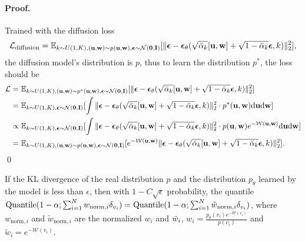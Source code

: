 \paragraph{Proof.} Trained with the diffusion loss
\begin{align}
\mathcal{L_\textrm{diffusion}}=\mathbb{E}_{k\sim U(1,K),(\mathbf{u},\mathbf{w})\sim p(\mathbf{u},\mathbf{w}),\bm{\epsilon}\sim \mathcal{N}(\mathbf{0},\mathbf{I})}
[\|\mathbf{\bm{\epsilon}} - \bm{\epsilon}_\theta(\sqrt{\bar{\alpha}_k}[\mathbf{u},\mathbf{w}] + \sqrt{1-\bar{\alpha}_k} \bm{\epsilon},k)\|_2^2],
\end{align}
the diffusion model's distribution is $p$, thus to learn the distribution $p^*$, the loss should be 
\begin{align}
\mathcal{L}&=\mathbb{E}_{k\sim U(1,K),(\mathbf{u},\mathbf{w})\sim p^*(\mathbf{u},\mathbf{w}),\bm{\epsilon}\sim \mathcal{N}(\mathbf{0},\mathbf{I})}
[\|\mathbf{\bm{\epsilon}} - \bm{\epsilon}_\theta(\sqrt{\bar{\alpha}_k}[\mathbf{u},\mathbf{w}] + \sqrt{1-\bar{\alpha}_k} \bm{\epsilon},k)\|_2^2] \\
&=\mathbb{E}_{k\sim U(1,K),\bm{\epsilon}\sim \mathcal{N}(\mathbf{0},\mathbf{I})}
[\int\|\mathbf{\bm{\epsilon}} - \bm{\epsilon}_\theta(\sqrt{\bar{\alpha}_k}[\mathbf{u},\mathbf{w}] + \sqrt{1-\bar{\alpha}_k} \bm{\epsilon},k)\|_2^2 \cdot p^*(\mathbf{u},\mathbf{w}) \textrm{d}\mathbf{u}\textrm{d}\mathbf{w}] \\
&\propto\mathbb{E}_{k\sim U(1,K),\bm{\epsilon}\sim \mathcal{N}(\mathbf{0},\mathbf{I})}
[\int\|\mathbf{\bm{\epsilon}} - \bm{\epsilon}_\theta(\sqrt{\bar{\alpha}_k}[\mathbf{u},\mathbf{w}] + \sqrt{1-\bar{\alpha}_k} \bm{\epsilon},k)\|_2^2 \cdot p(\mathbf{u},\mathbf{w})e^{-\mathcal{W}(\mathbf{u},\mathbf{w})} \textrm{d}\mathbf{u}\textrm{d}\mathbf{w}] \\
&=\mathbb{E}_{k\sim U(1,K),(\mathbf{u},\mathbf{w})\sim p(\mathbf{u},\mathbf{w}),\bm{\epsilon}\sim \mathcal{N}(\mathbf{0},\mathbf{I})}
[e^{-\mathcal{W}(\mathbf{u},\mathbf{w})}\|\mathbf{\bm{\epsilon}} - \bm{\epsilon}_\theta(\sqrt{\bar{\alpha}_k}[\mathbf{u},\mathbf{w}] + \sqrt{1-\bar{\alpha}_k} \bm{\epsilon},k)\|_2^2].
\end{align} \qed



\begin{theorem}
    If the KL divergence of the real distribution $p$ and the distribution $p_\theta$ learned by the model is less than $\epsilon$, then with $1-C\sqrt{\epsilon}$ probability, the quantile $\textrm{Quantile}(1-\alpha;\sum_{i=1}^N w_{\textrm{\textrm{norm}},i}\delta_{v_i})=\textrm{Quantile}(1-\alpha;\sum_{i=1}^N \tilde{w}_{\textrm{norm},i}\delta_{v_i})$, where $w_{\textrm{norm},i}$ and $\tilde{w}_{\textrm{norm},i}$ are the normalized $w_i$ and $\Tilde{w}_i$, $w_i=\frac{p_\theta(v_i) e^{-\mathcal{W}(v_i)}}{p(v_i)}$ and $\tilde{w}_i=e^{-\mathcal{W}(v_i)}$.
\end{theorem}

